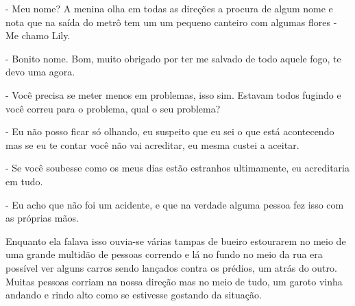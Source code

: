 - Meu nome? A menina olha em todas as direções a procura de algum nome e nota que na saída do metrô tem um um pequeno canteiro com algumas flores - Me chamo Lily.

- Bonito nome. Bom, muito obrigado por ter me salvado de todo aquele fogo, te devo uma agora.

- Você precisa se meter menos em problemas, isso sim. Estavam todos fugindo e você correu para o problema, qual o seu problema?

- Eu não posso ficar só olhando, eu suspeito que eu sei o que está acontecendo mas se eu te contar você não vai acreditar, eu mesma custei a aceitar.

- Se você soubesse como os meus dias estão estranhos ultimamente, eu acreditaria em tudo.

- Eu acho que não foi um acidente, e que na verdade alguma pessoa fez isso com as próprias mãos.

Enquanto ela falava isso ouvia-se várias tampas de bueiro estourarem no meio de uma grande multidão de pessoas correndo e lá no fundo no meio da rua era possível ver alguns carros sendo lançados contra os prédios, um atrás do outro. Muitas pessoas corriam na nossa direção mas no meio de tudo, um garoto vinha andando e rindo alto como se estivesse gostando da situação.